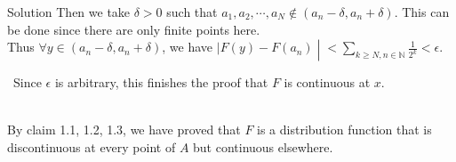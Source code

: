 \documentclass{qlnotes-export}
\begin{document}
\begin{qlsolution}{Solution}
Then we take \(\delta > 0\) such that \(a_{1},a_{2},\cdots,a_{N} \notin (a_{n} - \delta,a_{n} + \delta)\). This can be done since there are only finite points here.\\
Thus \(\forall y \in (a_{n} - \delta,a_{n} + \delta)\), we have \(\left. |F(y) - F(a_{n}) \middle| < \sum_{k \geq N,n \in {\mathbb{N}}}\frac{1}{2^{k}} < \epsilon \right.\).\\
\strut ~Since \(\epsilon\) is arbitrary, this finishes the proof that \(F\) is continuous at \(x\).\\
\strut \\
By claim 1.1, 1.2, 1.3, we have proved that \(F\) is a distribution function that is discontinuous at every point of \(A\) but continuous elsewhere.\\
\strut \\

\end{qlsolution}
\end{document}
